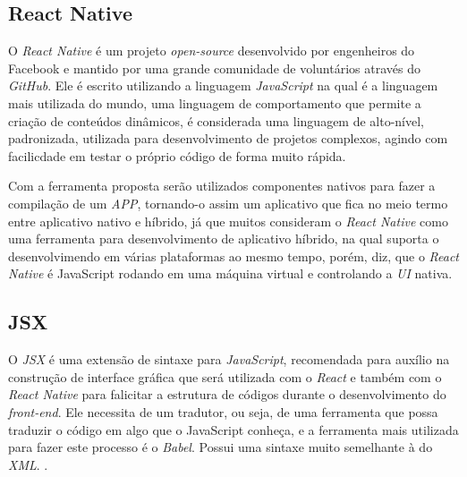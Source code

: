 \subsection{React Native}

O \textit{React Native} é um projeto \textit{open-source} desenvolvido por engenheiros do Facebook e mantido por uma grande comunidade de voluntários através do \textit{GitHub}. Ele é escrito utilizando a linguagem \textit{JavaScript} na qual é a linguagem mais utilizada do mundo, uma linguagem de comportamento que permite a criação de conteúdos dinâmicos, é considerada uma linguagem de alto-nível, padronizada, utilizada para desenvolvimento de projetos complexos, agindo com facilicdade em testar o próprio código de forma muito rápida.

Com a ferramenta proposta serão utilizados componentes nativos para fazer a compilação de um \textit{APP}, tornando-o assim um aplicativo que fica no meio termo entre aplicativo nativo e híbrido, já que muitos consideram o \textit{React Native} como uma ferramenta para desenvolvimento de aplicativo híbrido, na qual suporta o desenvolvimendo em várias plataformas ao mesmo tempo, porém,  diz, que o \textit{React Native} é JavaScript rodando em uma máquina virtual e controlando a \textit{UI} nativa.



\subsection{JSX}
O \textit{JSX} é uma extensão de sintaxe para \textit{JavaScript}, recomendada para auxílio na construção de interface gráfica que será utilizada com o \textit{React} e também com o \textit{React Native} para falicitar a estrutura de códigos durante o desenvolvimento do \textit{front-end}. Ele necessita de um tradutor, ou seja, de uma ferramenta que possa traduzir o código em algo que o JavaScript conheça, e a ferramenta mais utilizada para fazer este processo é o \textit{Babel}. Possui uma sintaxe muito semelhante à do \textit{XML}.  
\cite{jsx}.


